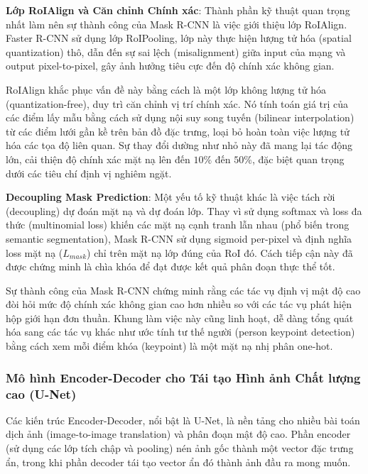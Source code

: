 \textbf{Lớp RoIAlign và Căn chỉnh Chính xác}: 
Thành phần kỹ thuật quan trọng nhất làm nên sự thành công của Mask R-CNN là việc giới thiệu lớp 
RoIAlign. Faster R-CNN sử dụng lớp RoIPooling, lớp này thực hiện lượng tử hóa (spatial 
quantization) thô, dẫn đến sự sai lệch (misalignment) giữa input của mạng và output 
pixel-to-pixel, gây ảnh hưởng tiêu cực đến độ chính xác không gian.\cite{He2017}

RoIAlign khắc phục vấn đề này bằng cách là một lớp không lượng tử hóa \\(quantization-free), 
duy trì căn chỉnh vị trí chính xác. Nó tính toán giá trị của các điểm lấy mẫu bằng cách sử 
dụng nội suy song tuyến (bilinear interpolation) từ các điểm lưới gần kề trên bản đồ đặc trưng, 
loại bỏ hoàn toàn việc lượng tử hóa các tọa độ liên quan. Sự thay đổi dường như nhỏ này đã mang 
lại tác động lớn, cải thiện độ chính xác mặt nạ lên đến $10\%$ đến $50\%$, đặc biệt quan trọng 
dưới các tiêu chí định vị nghiêm ngặt.\cite{He2017}

\textbf{Decoupling Mask Prediction}: Một yếu tố kỹ thuật khác là việc tách rời (decoupling) 
dự đoán mặt nạ và dự đoán lớp. Thay vì sử dụng softmax và loss đa thức (multinomial loss) 
khiến các mặt nạ cạnh tranh lẫn nhau (phổ biến trong semantic segmentation), Mask R-CNN sử 
dụng sigmoid per-pixel và định nghĩa loss mặt nạ ($L_{mask}$) chỉ trên mặt nạ lớp đúng của 
RoI đó. Cách tiếp cận này đã được chứng minh là chìa khóa để đạt được kết quả phân đoạn 
thực thể tốt.\cite{He2017}

Sự thành công của Mask R-CNN chứng minh rằng các tác vụ định vị mật độ cao đòi hỏi mức độ 
chính xác không gian cao hơn nhiều so với các tác vụ phát hiện hộp giới hạn đơn thuần. 
Khung làm việc này cũng linh hoạt, dễ dàng tổng quát hóa sang các tác vụ khác như ước tính 
tư thế người (person keypoint detection) bằng cách xem mỗi điểm khóa (keypoint) là một mặt nạ 
nhị phân one-hot.

\subsubsection{Mô hình Encoder-Decoder cho Tái tạo Hình ảnh Chất lượng cao (U-Net)}
Các kiến trúc Encoder-Decoder, nổi bật là U-Net, là nền tảng cho nhiều bài toán dịch ảnh 
(image-to-image translation) và phân đoạn mật độ cao. Phần encoder (sử dụng các lớp tích 
chập và pooling) nén ảnh gốc thành một vector đặc trưng ẩn, trong khi phần decoder tái 
tạo vector ẩn đó thành ảnh đầu ra mong muốn.\cite{Hasan2019}

